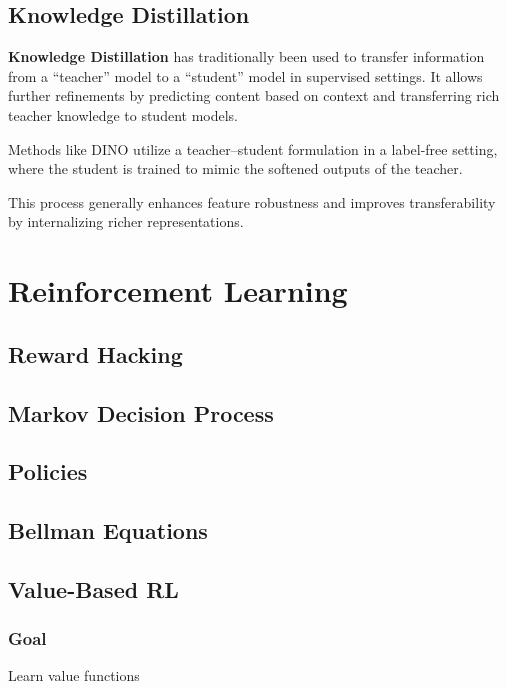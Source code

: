 \documentclass{article}
\begin{document}
\subsection{Knowledge Distillation}

\textbf{Knowledge Distillation} has traditionally been used to transfer information from a “teacher” model to a “student” model in supervised settings. It allows further refinements by predicting content based on context and transferring rich teacher knowledge to student models.

Methods like DINO utilize a teacher--student formulation in a label-free setting, where the student is trained to mimic the softened outputs of the teacher.

This process generally enhances feature robustness and improves transferability by internalizing richer representations.

\clearpage\newpage

\section{Reinforcement Learning}

\subsection{Reward Hacking}

\subsection{Markov Decision Process}

\subsection{Policies}

\subsection{Bellman Equations}

\subsection{Value-Based RL}

\subsubsection{Goal} Learn value functions
\end{document}
